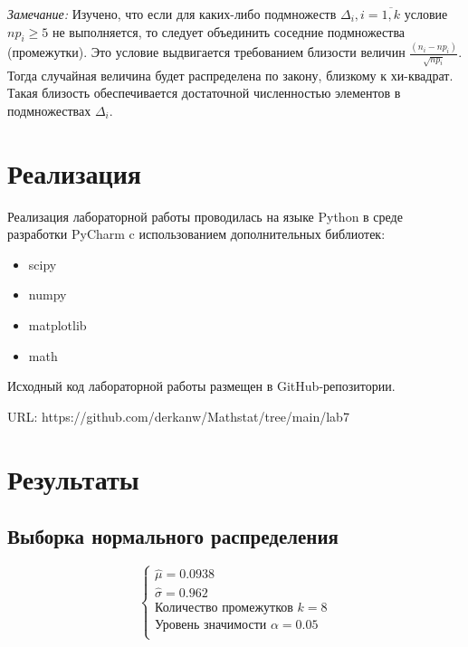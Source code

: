 \documentclass[12pt,a4paper]{article}
\begin{document}
\textit{Замечание:} Изучено, что если для каких-либо подмножеств $\Delta_i,i=\overline{1,k}$ условие $np_i\geq5$ не выполняется, то следует объединить соседние подмножества (промежутки). Это условие выдвигается требованием близости величин $\frac{(n_i-np_i)}{\sqrt{np_i}}$. Тогда случайная величина будет распределена по закону, близкому к хи-квадрат. Такая близость обеспечивается достаточной численностью элементов в подмножествах $\Delta_i$.


\section{Реализация}
Реализация лабораторной работы проводилась на языке Python в среде разработки PyCharm c использованием дополнительных библиотек:
\begin{itemize}
    \item scipy
    \item numpy
    \item matplotlib
    \item math
\end{itemize}

Исходный код лабораторной работы размещен в GitHub-репозитории.

URL: https://github.com/derkanw/Mathstat/tree/main/lab7

\section {Результаты}
\subsection{Выборка нормального распределения}
\begin{equation}
    \left\{
    \begin{array}{ll}
        \hat{\mu}=0.0938\\
        \hat{\sigma}=0.962\\
        \text{Количество промежутков }k=8\\
        \text{Уровень значимости }\alpha=0.05\\
    \end{array}
    \right.
\end{equation}
\end{document}
